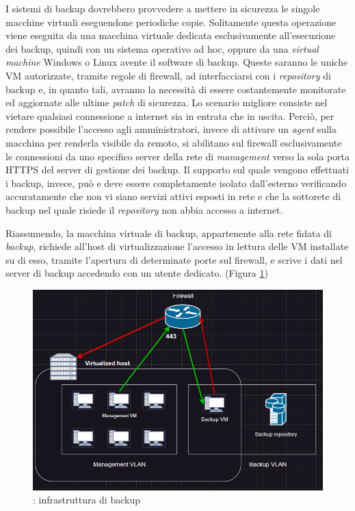 \documentclass[target=bach,aauheader=]{thud}
\begin{document}
I sistemi di backup dovrebbero provvedere a mettere in sicurezza le singole macchine virtuali eseguendone periodiche copie. Solitamente questa operazione viene eseguita da una macchina virtuale dedicata esclusivamente all'esecuzione dei backup, quindi con un sistema operativo ad hoc, oppure da una \textit{virtual machine} Windows o Linux avente il software di backup. Queste saranno le uniche VM autorizzate, tramite regole di firewall, ad interfacciarsi con i \textit{repository} di backup e, in quanto tali, avranno la necessità di essere costantemente monitorate ed aggiornate alle ultime \textit{patch} di sicurezza. Lo scenario migliore consiste nel vietare qualsiasi connessione a internet sia in entrata che in uscita. Perciò, per rendere possibile l'accesso agli amministratori, invece di attivare un \textit{agent} sulla macchina per renderla visibile da remoto, si abilitano sul firewall esclusivamente le connessioni da uno specifico server della rete di \textit{management} verso la sola porta HTTPS del server di gestione dei backup. Il supporto sul quale vengono effettuati i backup, invece, può e deve essere completamente isolato dall'esterno verificando accuratamente che non vi siano servizi attivi esposti in rete e che la sottorete di backup nel quale risiede il \textit{repository} non abbia accesso a internet.

Riassumendo, la macchina virtuale di backup, appartenente alla rete fidata di \textit{backup}, richiede all'host di virtualizzazione l'accesso in lettura delle VM installate su di esso, tramite l'apertura di determinate porte sul firewall, e scrive i dati nel server di backup accedendo con un utente dedicato. (Figura \ref{fig:backup})

\begin{figure}[t]
    \centering
    \includegraphics[width=1\linewidth]{images/backup.png}
    \caption{: infrastruttura di backup}
    \label{fig:backup}
\end{figure}
\end{document}
